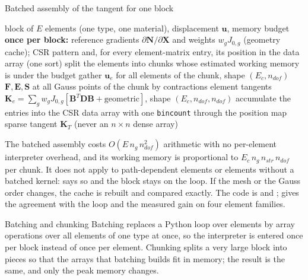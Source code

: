 
\begin{algbox}{Batched assembly of the tangent for one block}
\begin{pseudo}
\Require block of $E$ elements (one type, one material), displacement $\bm u$, memory budget
\State \textbf{once per block:} reference gradients $\partial\bm N/\partial\bm X$ and weights $w_gJ_{0,g}$ (geometry cache); CSR pattern and, for every element-matrix entry, its position in the data array (one sort)
\State split the elements into chunks whose estimated working memory is under the budget
  \State gather $\bm u_e$ for all elements of the chunk, shape $(E_c,n_{dof})$
  \State $\bm F,\bm E,\bm S$ at all Gauss points of the chunk by contractions 
  \State element tangents $\bm K_e=\sum_g w_gJ_{0,g}[\bm B^T\bm D\bm B+\text{geometric}]$, shape $(E_c,n_{dof},n_{dof})$
  \State accumulate the entries into the CSR data array with one \texttt{bincount} through the position map
\EndFor
\Ensure sparse tangent $\bm K_T$ (never an $n\times n$ dense array)
\end{pseudo}
\end{algbox}

The batched assembly costs $O(E\,n_g\,n_{dof}^2)$ arithmetic with no per-element interpreter overhead, and its working memory is proportional to $E_c\,n_g\,n_{str}\,n_{dof}$ per chunk. It does not apply to path-dependent elements or elements without a batched kernel:  says so and the block stays on the loop. If the mesh or the Gauss order changes, the cache is rebuilt and compared exactly. The code is  and ;  gives the agreement with the loop and the measured gain on four element families.

\begin{sidenote}{Batching and chunking}
Batching replaces a Python loop over elements by array operations over all elements of one type at once, so the interpreter is entered once per block instead of once per element. Chunking splits a very large block into pieces so that the arrays that batching builds fit in memory; the result is the same, and only the peak memory changes.
\end{sidenote}

